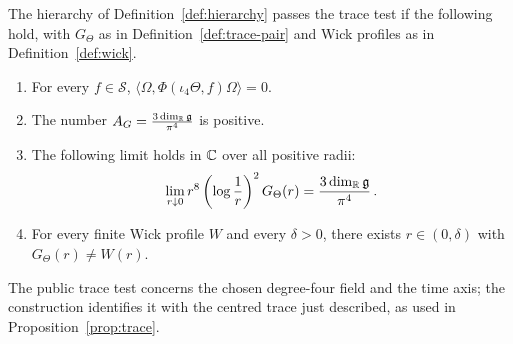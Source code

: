 \begin{definition}\label{def:trace}
The hierarchy of Definition~\ref{def:hierarchy} passes the trace test if the following hold, with $G_\Theta$ as in Definition~\ref{def:trace-pair} and Wick profiles as in Definition~\ref{def:wick}.
\begin{enumerate}[label=\textup{T\arabic*.},ref=T\arabic*]
\item\label{trace:1} For every $f\in\mathcal S$, $\langle\Omega,\Phi(\iota_4\Theta,f)\Omega\rangle=0$.
\item\label{trace:2} The number $A_G=\frac{3\dim_\mathbb R\mathfrak g}{\pi^4}$ is positive.
\item\label{trace:3} The following limit holds in $\mathbb C$ over all positive radii:
\begin{equation}\label{eq:trace-law}
\lim_{r\downarrow0}r^8\left(\log\frac{1}{r}\right)^2G_\Theta(r)=\frac{3\dim_\mathbb R\mathfrak g}{\pi^4}\,.
\end{equation}
\item\label{trace:4} For every finite Wick profile $W$ and every $\delta>0$, there exists $r\in(0,\delta)$ with $G_\Theta(r)\ne W(r)$.
\end{enumerate}
\end{definition}

The public trace test concerns the chosen degree-four field and the time axis; the construction identifies it with the centred trace just described, as used in Proposition~\ref{prop:trace}.

